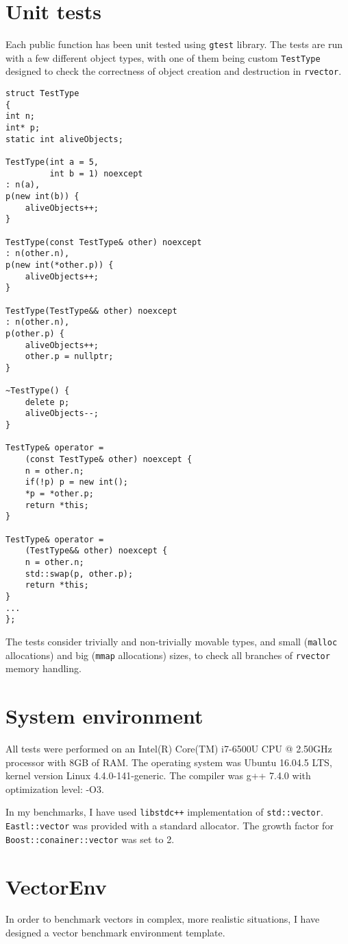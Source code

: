\documentclass[inz, english, shortabstract]{iithesis}
\begin{document}
\section{Unit tests}

Each public function has been unit tested using {\tt gtest} library\cite{rvector_tests}.
The tests are run with a few different object types, with one of them being custom {\tt TestType} designed to check the correctness of object creation and destruction in {\tt rvector}.

\begin{lstlisting}[caption=TestType, multicols=2, label=TestType_impl]
struct TestType
{
int n;
int* p;
static int aliveObjects;

TestType(int a = 5, 
		 int b = 1) noexcept
: n(a),
p(new int(b)) {
	aliveObjects++;
}

TestType(const TestType& other) noexcept
: n(other.n),
p(new int(*other.p)) {
	aliveObjects++;
}

TestType(TestType&& other) noexcept
: n(other.n),
p(other.p) {
	aliveObjects++;
	other.p = nullptr;
}

~TestType() {
	delete p;
	aliveObjects--;
}

TestType& operator = 
	(const TestType& other) noexcept {
	n = other.n;
	if(!p) p = new int();
	*p = *other.p;
	return *this;
}

TestType& operator = 
	(TestType&& other) noexcept {
	n = other.n;
	std::swap(p, other.p);
	return *this;
}
...
};
\end{lstlisting}
The tests consider trivially and non-trivially movable types, and small ({\tt malloc} allocations) and big ({\tt mmap} allocations) sizes, to check all branches of {\tt rvector} memory handling.


\section{System environment}
All tests were performed on an Intel(R) Core(TM) i7-6500U CPU @ 2.50GHz processor with 8GB of RAM.
The operating system was Ubuntu 16.04.5 LTS, kernel version Linux 4.4.0-141-generic.
The compiler was g++ 7.4.0 with optimization level: -O3.

In my benchmarks, I have used {\tt libstdc++} implementation\cite{std::vector_impl} of {\tt std::vector}.
{\tt Eastl::vector} was provided with a standard allocator.
The growth factor for {\tt Boost::conainer::vector} was set to 2. 

\section{VectorEnv}
In order to benchmark vectors in complex, more realistic situations, I have designed a vector benchmark environment template.
\end{document}
